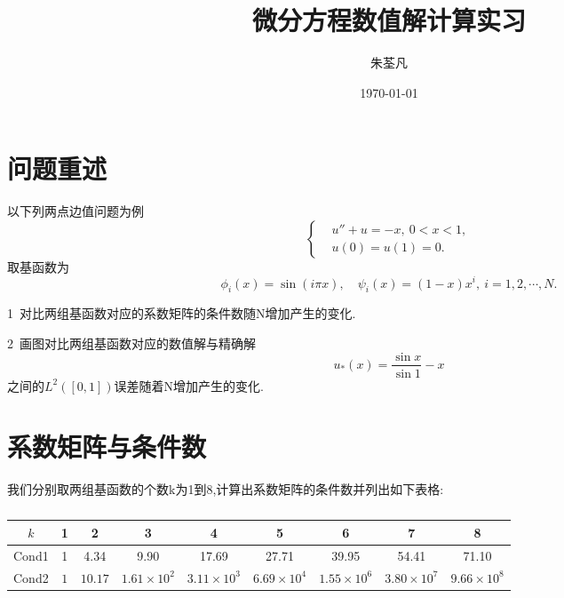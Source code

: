 \documentclass[11pt,reqno]{article}
\numberwithin{equation}{section}
\begin{document}
\title{微分方程数值解计算实习}

\author{朱荃凡}
\date{\today}

\maketitle


\section{问题重述}

以下列两点边值问题为例
\begin{equation}
	\left\{
	\begin{aligned}
		& u''+u=-x,\ 0<x<1,\\
		& u(0)=u(1)=0.
	\end{aligned}
	\right.
	\end{equation}
取基函数为
\[\phi_i(x)=\sin(i\pi x),\quad\psi_i(x)=(1-x)x^i,\ i=1,2,\cdots,N.\]

1\ 对比两组基函数对应的系数矩阵的条件数随N增加产生的变化.

2\ 画图对比两组基函数对应的数值解与精确解
\begin{equation}
	u_*(x)=\frac{\sin x}{\sin 1}-x
\end{equation}
之间的$L^2([0,1])$误差随着N增加产生的变化.


\section{系数矩阵与条件数}

我们分别取两组基函数的个数k为1到8,计算出系数矩阵的条件数并列出如下表格:
\begin{table}[h]\label{table1}
	\begin{center}
	\caption{}
	\begin{tabular}{|c|c|c|c|c|c|c|c|c|}
		\hline	
		 $k$ & 1 & 2 & 3 & 4 & 5 & 6 & 7 & 8\\
		\hline
		Cond1 & 1 & 4.34 & 9.90 & 17.69 & 27.71 & 39.95 & 54.41 & 71.10 \\
		\hline
		Cond2 &$1$ & $10.17$& $1.61\times10^2$ & $3.11\times10^3$ & $6.69\times10^4$
		& $1.55\times10^6$ & $3.80\times10^7$ & $9.66\times10^8$ \\
		\hline
	\end{tabular}
	\end{center}
\end{table}
\end{document}
